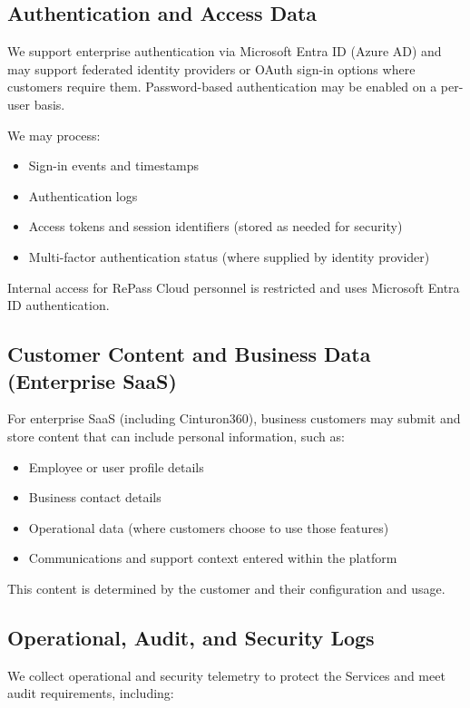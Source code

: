 \documentclass[11pt]{article}
\begin{document}
\subsection{Authentication and Access Data}

We support enterprise authentication via Microsoft Entra ID (Azure AD) and may support federated identity providers or OAuth sign-in options where customers require them. Password-based authentication may be enabled on a per-user basis.

We may process:

\begin{itemize}
\item Sign-in events and timestamps
\item Authentication logs
\item Access tokens and session identifiers (stored as needed for security)
\item Multi-factor authentication status (where supplied by identity provider)
\end{itemize}

Internal access for RePass Cloud personnel is restricted and uses Microsoft Entra ID authentication.

\subsection{Customer Content and Business Data (Enterprise SaaS)}

For enterprise SaaS (including Cinturon360), business customers may submit and store content that can include personal information, such as:

\begin{itemize}
\item Employee or user profile details
\item Business contact details
\item Operational data (where customers choose to use those features)
\item Communications and support context entered within the platform
\end{itemize}

This content is determined by the customer and their configuration and usage.

\subsection{Operational, Audit, and Security Logs}

We collect operational and security telemetry to protect the Services and meet audit requirements, including:
\end{document}
